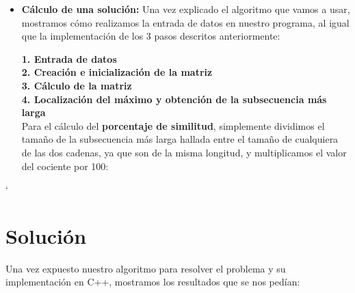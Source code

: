 \documentclass[10pt,a4paper]{article}
\begin{document}
\begin{itemize}
	
	\item \textbf{Cálculo de una solución:} Una vez explicado el algoritmo que vamos a usar, mostramos cómo realizamos la entrada de datos en nuestro programa, al igual que la implementación de los 3 pasos descritos anteriormente:
	
	\textbf{1. Entrada de datos}
	\\
	
	\textbf{2. Creación e inicialización de la matriz}
	\\
	
	\textbf{3. Cálculo de la matriz}
	\\
	
	\textbf{4. Localización del máximo y obtención de la subsecuencia más larga}
	\\
	
	
	Para el cálculo del \textbf{porcentaje de similitud}, simplemente dividimos el tamaño de la subsecuencia más larga hallada entre el tamaño de cualquiera de las dos cadenas, ya que son de la misma longitud, y multiplicamos el valor del cociente por 100:
	
	
\end{itemize}
 `

\section{Solución}

Una vez expuesto nuestro algoritmo para resolver el problema y su implementación en C++, mostramos los resultados que se nos pedían:
\end{document}
